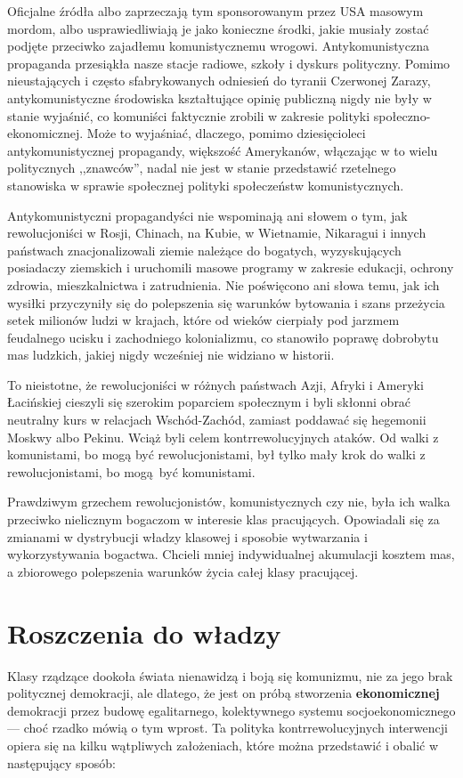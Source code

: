 \documentclass[12pt]{book}
\newcommand{\sekcja}[1]{
  \addcontentsline{toc}{section}{#1}
  \section*{#1}
}
\begin{document}
Oficjalne źródła albo zaprzeczają tym sponsorowanym przez USA masowym mordom, albo usprawiedliwiają je jako konieczne środki, jakie musiały zostać podjęte przeciwko zajadłemu komunistycznemu wrogowi. Antykomunistyczna propaganda przesiąkła nasze stacje radiowe, szkoły i dyskurs polityczny. Pomimo nieustających i często sfabrykowanych odniesień do tyranii Czerwonej Zarazy, antykomunistyczne środowiska kształtujące opinię publiczną nigdy nie były w stanie wyjaśnić, co komuniści faktycznie zrobili w zakresie polityki społeczno-ekonomicznej. Może to wyjaśniać, dlaczego, pomimo dziesięcioleci antykomunistycznej propagandy, większość Amerykanów, włączając w to wielu politycznych ,,znawców'', nadal nie jest w stanie przedstawić rzetelnego stanowiska w sprawie społecznej polityki społeczeństw komunistycznych.

Antykomunistyczni propagandyści nie wspominają ani słowem o tym, jak rewolucjoniści w Rosji, Chinach, na Kubie, w Wietnamie, Nikaragui i innych państwach znacjonalizowali ziemie należące do bogatych, wyzyskujących posiadaczy ziemskich i uruchomili masowe programy w zakresie edukacji, ochrony zdrowia, mieszkalnictwa i zatrudnienia. Nie poświęcono ani słowa temu, jak ich wysiłki przyczyniły się do polepszenia się warunków bytowania i szans przeżycia setek milionów ludzi w krajach, które od wieków cierpiały pod jarzmem feudalnego ucisku i zachodniego kolonializmu, co stanowiło poprawę dobrobytu mas ludzkich, jakiej nigdy wcześniej nie widziano w historii.

To nieistotne, że rewolucjoniści w różnych państwach Azji, Afryki i Ameryki Łacińskiej cieszyli się szerokim poparciem społecznym i byli skłonni obrać neutralny kurs w relacjach Wschód-Zachód, zamiast poddawać się hegemonii Moskwy albo Pekinu. Wciąż byli celem kontrrewolucyjnych ataków. Od walki z komunistami, bo mogą być rewolucjonistami, był tylko mały krok do walki z rewolucjonistami, bo mogą być komunistami.

Prawdziwym grzechem rewolucjonistów, komunistycznych czy nie, była ich walka przeciwko nielicznym bogaczom w interesie klas pracujących. Opowiadali się za zmianami w dystrybucji władzy klasowej i sposobie wytwarzania i wykorzystywania bogactwa. Chcieli mniej indywidualnej akumulacji kosztem mas, a zbiorowego polepszenia warunków życia całej klasy pracującej.

\sekcja{Roszczenia do władzy}
Klasy rządzące dookoła świata nienawidzą i boją się komunizmu, nie za jego brak politycznej demokracji, ale dlatego, że jest on próbą stworzenia \textbf{ekonomicznej} demokracji przez budowę egalitarnego, kolektywnego systemu socjoekonomicznego — choć rzadko mówią o tym wprost. Ta polityka kontrrewolucyjnych interwencji opiera się na kilku wątpliwych założeniach, które można przedstawić i obalić w następujący sposób:
\end{document}
